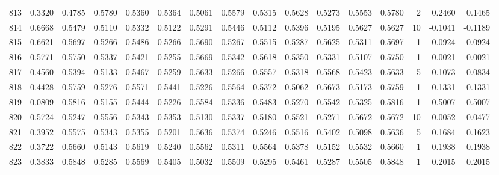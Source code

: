 \begin{tabular}{lrrrrrrrrrrrrrrr}
813 &      0.3320 &  0.4785 &  0.5780 &  0.5360 &  0.5364 &  0.5061 &  0.5579 &  0.5315 &  0.5628 &  0.5273 &   0.5553 &     0.5780 &      2 &                    0.2460 &                     0.1465 \\
814 &      0.6668 &  0.5479 &  0.5110 &  0.5332 &  0.5122 &  0.5291 &  0.5446 &  0.5112 &  0.5396 &  0.5195 &   0.5627 &     0.5627 &     10 &                   -0.1041 &                    -0.1189 \\
815 &      0.6621 &  0.5697 &  0.5266 &  0.5486 &  0.5266 &  0.5690 &  0.5267 &  0.5515 &  0.5287 &  0.5625 &   0.5311 &     0.5697 &      1 &                   -0.0924 &                    -0.0924 \\
816 &      0.5771 &  0.5750 &  0.5337 &  0.5421 &  0.5255 &  0.5669 &  0.5342 &  0.5618 &  0.5350 &  0.5331 &   0.5107 &     0.5750 &      1 &                   -0.0021 &                    -0.0021 \\
817 &      0.4560 &  0.5394 &  0.5133 &  0.5467 &  0.5259 &  0.5633 &  0.5266 &  0.5557 &  0.5318 &  0.5568 &   0.5423 &     0.5633 &      5 &                    0.1073 &                     0.0834 \\
818 &      0.4428 &  0.5759 &  0.5276 &  0.5571 &  0.5441 &  0.5226 &  0.5564 &  0.5372 &  0.5062 &  0.5673 &   0.5173 &     0.5759 &      1 &                    0.1331 &                     0.1331 \\
819 &      0.0809 &  0.5816 &  0.5155 &  0.5444 &  0.5226 &  0.5584 &  0.5336 &  0.5483 &  0.5270 &  0.5542 &   0.5325 &     0.5816 &      1 &                    0.5007 &                     0.5007 \\
820 &      0.5724 &  0.5247 &  0.5556 &  0.5343 &  0.5353 &  0.5130 &  0.5337 &  0.5180 &  0.5521 &  0.5271 &   0.5672 &     0.5672 &     10 &                   -0.0052 &                    -0.0477 \\
821 &      0.3952 &  0.5575 &  0.5343 &  0.5355 &  0.5201 &  0.5636 &  0.5374 &  0.5246 &  0.5516 &  0.5402 &   0.5098 &     0.5636 &      5 &                    0.1684 &                     0.1623 \\
822 &      0.3722 &  0.5660 &  0.5143 &  0.5619 &  0.5240 &  0.5562 &  0.5311 &  0.5564 &  0.5378 &  0.5152 &   0.5532 &     0.5660 &      1 &                    0.1938 &                     0.1938 \\
823 &      0.3833 &  0.5848 &  0.5285 &  0.5569 &  0.5405 &  0.5032 &  0.5509 &  0.5295 &  0.5461 &  0.5287 &   0.5505 &     0.5848 &      1 &                    0.2015 &                     0.2015 \\

\end{tabular}
